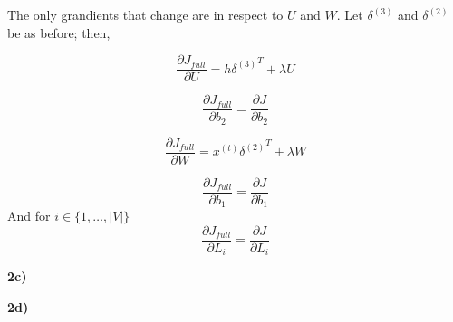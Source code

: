 \documentclass{article}
\begin{document}
The only grandients that change are in respect to $U$ and $W$. Let $\delta^{(3)}$ and $\delta^{(2)}$ be as before; then,

\begin{equation}\label{eq:18}
\frac{\partial J_{full}}{\partial  U} = {h \delta^{(3)}}^{T} + \lambda U 
\end{equation}

\begin{equation}\label{eq:19}
\frac{\partial J_{full}}{\partial  b_{2}} =  \frac{\partial J}{\partial  b_{2}}
\end{equation}

\begin{equation}\label{eq:21}
\frac{\partial J_{full}}{\partial  W} = {x^{(t)} \delta^{(2)}}^{T} + \lambda W 
\end{equation}

\begin{equation}\label{eq:22}
\frac{\partial J_{full}}{\partial  b_{1}} =  \frac{\partial J}{\partial  b_{1}} 
\end{equation}
And for $i \in \{1, \dots, |V|\}$
\begin{equation}\label{eq:23}
\frac{\partial J_{full}}{\partial  L_{i}} =  \frac{\partial J}{\partial  L_{i}} 
\end{equation}

\textbf{2c)}

\textbf{2d)}
\end{document}
